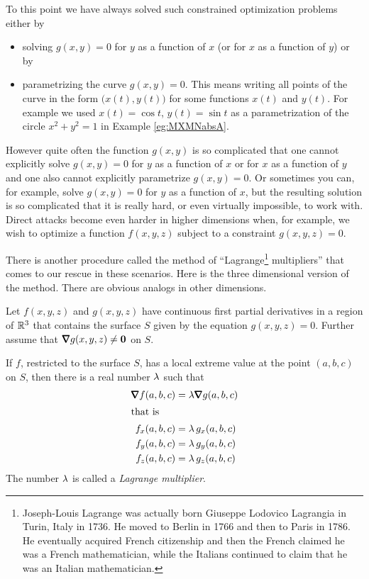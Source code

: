 To this point we have always solved such constrained optimization
problems either by
\begin{itemize} 
\item solving $g(x,y)=0$ for $y$ as a function of $x$ (or for
$x$ as a function of $y$) or by
\item parametrizing the curve $g(x,y)=0$. This means writing all points
of the curve in the form $\big(x(t), y(t)\big)$ for some functions $x(t)$
and $y(t)$. For example we used $x(t)=\cos t$, $y(t)=\sin t$ as 
a parametrization of the circle $x^2+y^2=1$ in Example \ref{eg:MXMNabsA}.
\end{itemize}
However quite often the function $g(x,y)$ is so complicated that 
one cannot explicitly solve $g(x,y)=0$ for $y$ as a function  of $x$ or 
for $x$ as a function of $y$ and one also cannot explicitly 
parametrize $g(x,y)=0$. Or sometimes you can, for example, solve $g(x,y)=0$ 
for $y$ as a function of $x$, but the resulting solution is so 
complicated that it is really hard, or even virtually impossible, to work 
with. Direct attacks become even harder in higher dimensions when, for example,
we wish to optimize a function $f(x,y,z)$ subject to a constraint 
$g(x,y,z)=0$. 

There is another procedure called the method of 
``Lagrange\footnote{Joseph-Louis Lagrange was actually born 
Giuseppe Lodovico Lagrangia in Turin, Italy in 1736. He moved to Berlin
in 1766 and then to Paris in 1786. He eventually acquired French citizenship
and then the French claimed he was a French mathematician, while the 
Italians continued to claim that he was an Italian mathematician.

} multipliers''
that comes to our rescue in these scenarios. Here is the three dimensional
version of the method. There are obvious analogs in other dimensions.

\begin{theorem}\label{thm Lagrange}
Let $f(x,y,z)$ and $g(x,y,z)$  have continuous first partial derivatives in a 
region of $\mathbb{R}^3$ that contains the surface $S$ given by the equation 
$g(x,y,z)=0$. Further assume that $\vnabla g(x,y,z)\ne\vZero$ on $S$. 

\medskip

If $f$, restricted 
to the surface $S$, has a local extreme value at the point $(a,b,c)$ on $S$, 
then there is a real number $\lambda$ such that
\begin{align*}
\vnabla f(a,b,c) &= \la\vnabla g(a,b,c) \\
\intertext{that is}
f_x(a,b,c) &= \la\, g_x(a,b,c)\\
f_y(a,b,c) &= \la\, g_y(a,b,c)\\
f_z(a,b,c) &= \la\, g_z(a,b,c)
\end{align*}
The number $\lambda$ is called a \emph{Lagrange multiplier}.
\end{theorem}

